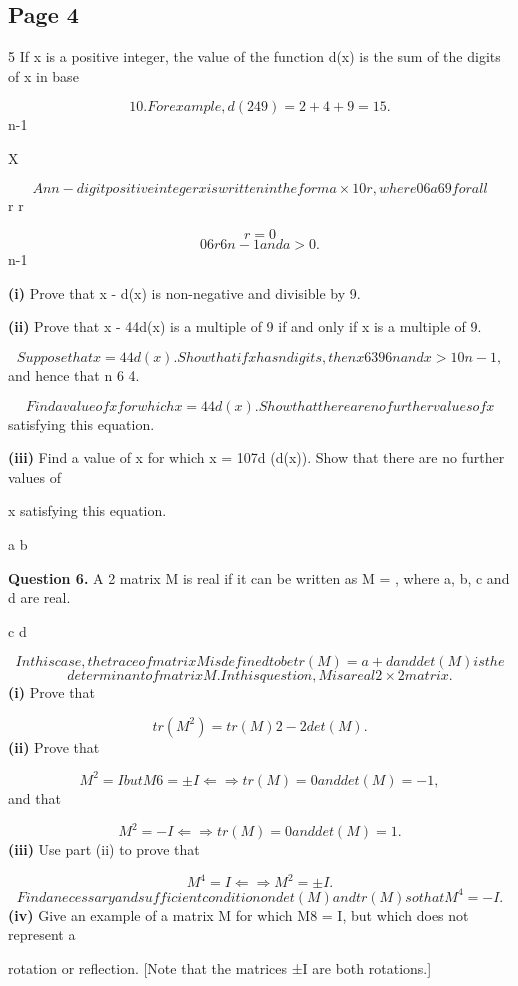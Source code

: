 \documentclass[12pt]{article}
\begin{document}
\subsection*{Page 4}
\begin{flushleft}
5 If x is a positive integer, the value of the function d(x) is the sum of the digits of x in base\par
\[10. For example, d(249) = 2 + 4 + 9 = 15.\]
n-1\par
X\par
\[An n-digit positive integer x is written in the form a \times 10r, where 0 6 a 6 9 for all\]
r r\par
\[r=0\]
\[0 6 r 6 n - 1 and a > 0.\]
n-1\par
\textbf{(i)} Prove that x - d(x) is non-negative and divisible by 9.\par
\textbf{(ii)} Prove that x - 44d(x) is a multiple of 9 if and only if x is a multiple of 9.\par
\[Suppose that x = 44d(x). Show that if x has n digits, then x 6 396n and x > 10n-1,\]
and hence that n 6 4.\par
\[Find a value of x for which x = 44d(x). Show that there are no further values of x\]
satisfying this equation.\par
\textbf{(iii)} Find a value of x for which x = 107d (d(x)). Show that there are no further values of\par
x satisfying this equation.\par
\lambda \mu\par
a b\par
\bigskip\textbf{Question 6.} A 2  matrix M is real if it can be written as M = , where a, b, c and d are real.\par
c d\par
\[In this case, the trace of matrix M is defined to be tr(M) = a + d and det(M) is the\]
\[determinant of matrix M. In this question, M is a real 2 \times 2 matrix.\]
\textbf{(i)} Prove that\par
\[tr(M^2) = tr(M)2 - 2det(M).\]
\textbf{(ii)} Prove that\par
\[M^2 = I but M 6= ±I ⇐⇒ tr(M) = 0 and det(M) = -1,\]
and that\par
\[M^2 = -I ⇐⇒ tr(M) = 0 and det(M) = 1.\]
\textbf{(iii)} Use part (ii) to prove that\par
\[M^4 = I ⇐⇒ M^2 = ±I.\]
\[Find a necessary and sufficient condition on det(M) and tr(M) so that M^4 = -I.\]
\textbf{(iv)} Give an example of a matrix M for which M8 = I, but which does not represent a\par
rotation or reflection. [Note that the matrices ±I are both rotations.]\par
\end{flushleft}
\end{document}
